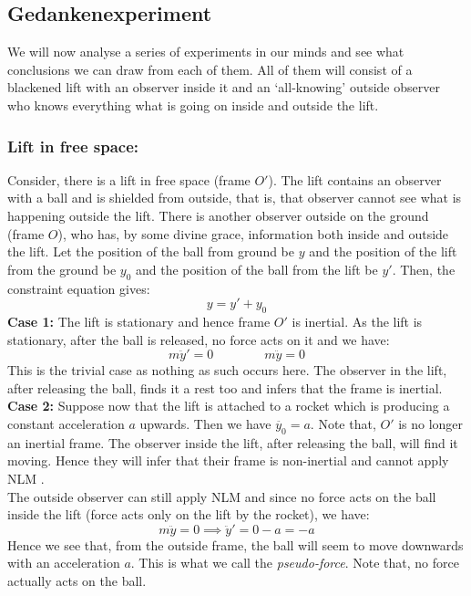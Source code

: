 \subsection{Gedankenexperiment}
We will now analyse a series of experiments in our minds and see what conclusions we can draw from each of them. All of them will consist of a blackened lift with an observer inside it and an `all-knowing' outside observer who knows everything what is going on inside and outside the lift. 
\subsubsection{Lift in free space:}
\begin{figure}[H]
    \centering
    
\end{figure}
Consider, there is a lift in free space (frame $O'$). The lift contains an observer with a ball and is shielded from outside, that is, that observer cannot see what is happening outside the lift. There is another observer outside on the ground (frame $O$), who has, by some divine grace, information both inside and outside the lift. Let the position of the ball from ground be $y$ and the position of the lift from the ground be $y_0$ and the position of the ball from the lift be $y'$. Then, the constraint equation gives:
$$y=y'+y_0$$
\textbf{Case 1:} The lift is stationary and hence frame $O'$ is inertial. As the lift is stationary, after the ball is released, no force acts on it and we have:
$$m\ddot{y}' = 0 \qquad \qquad m\ddot{y}=0$$
This is the trivial case as nothing as such occurs here. The observer in the lift, after releasing the ball, finds it a rest too and infers that the frame is inertial. \\[0.2cm]
\textbf{Case 2:} Suppose now that the lift is attached to a rocket which is producing a constant acceleration $a$ upwards. Then we have $\ddot{y_0} = a$. Note that, $O'$ is no longer an inertial frame. The observer inside the lift, after releasing the ball, will find it moving. Hence they will infer that their frame is non-inertial and cannot apply NLM .\\[0.2cm]
The outside observer can still apply NLM and since no force acts on the ball inside the lift (force acts only on the lift by the rocket), we have:
$$m\ddot{y} = 0 \implies \ddot{y}' = 0-a = -a$$
Hence we see that, from the outside frame, the ball will seem to move downwards with an acceleration $a$. This is what we call the \textit{pseudo-force}. Note that, no force actually acts on the ball. 
